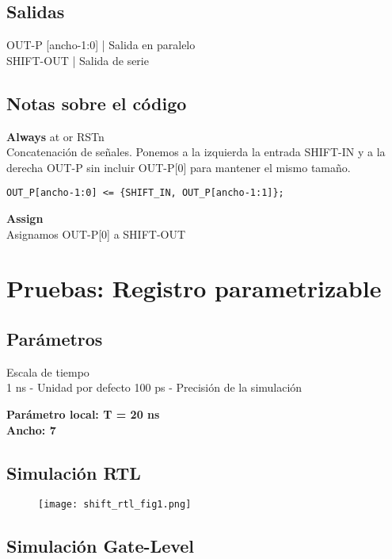 \documentclass{article}
\newcommand{\iconpath}{/home/khz/git/tabler-icons/icons/outline-white/}
\newcommand{\icon}[1]{}
\begin{document}
\subsection{Salidas}
\icon{clock} \icon{arrow-right} \icon{matrix} OUT-P [ancho-1:0] | Salida en paralelo \\
\icon{clock-off} \icon{arrow-right} \icon{wave-square} SHIFT-OUT | Salida de serie
\subsection{Notas sobre el código}
\textbf{Always} at \icon{s-turn-up} \icon{clock} or \icon{s-turn-down} RSTn \\
Concatenación de señales. Ponemos a la izquierda la entrada SHIFT-IN y a la derecha OUT-P sin incluir OUT-P[0] para mantener el mismo tamaño.
\begin{lstlisting}[style=verilog]
OUT_P[ancho-1:0] <= {SHIFT_IN, OUT_P[ancho-1:1]};
\end{lstlisting} 
\begin{flushleft}
\textbf{Assign} \\
Asignamos OUT-P[0] a SHIFT-OUT
\end{flushleft}
\section{Pruebas: Registro parametrizable}
\subsection{Parámetros}
\begin{flushleft}
Escala de tiempo \\
1 ns - Unidad por defecto
100 ps - Precisión de la simulación
\end{flushleft}
\textbf{Parámetro local: T = 20 ns} \\
\textbf{Ancho: 7}

\subsection{Simulación RTL}
\begin{figure}[h!]
    \centering
    \texttt{[image: shift\_rtl\_fig1.png]} 
\end{figure}
\subsection{Simulación Gate-Level}
\end{document}
